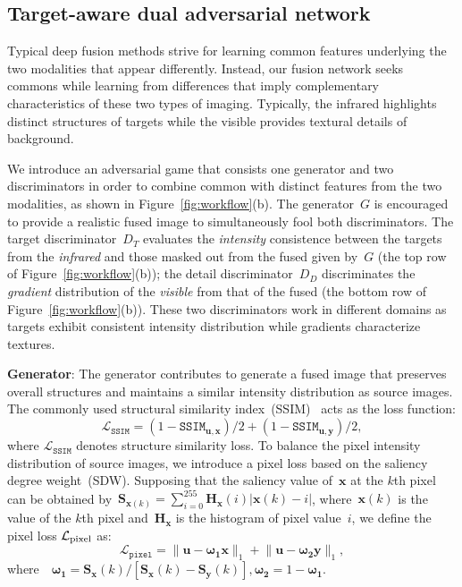 \documentclass[10pt,twocolumn,letterpaper]{article}
\begin{document}
\subsection{Target-aware dual adversarial network}
Typical deep fusion methods strive for learning common features underlying the two modalities that appear differently. Instead, our fusion network seeks commons while learning from differences that imply complementary characteristics of these two types of imaging. Typically, the infrared highlights distinct structures of targets while the visible provides textural details of background.

We introduce an adversarial game that consists one generator and two discriminators in order to combine common with distinct features from the two modalities, as shown in Figure~\ref{fig:workflow}(b). The generator~$G$ is encouraged to provide a realistic fused image to simultaneously fool both discriminators. The target discriminator~$D_T$ evaluates the \emph{intensity} consistence between the targets from the \emph{infrared} and those masked out from the fused given by~$G$ (the top row of Figure~\ref{fig:workflow}(b)); the detail discriminator~$D_D$ discriminates the \emph{gradient} distribution of the \emph{visible} from that of the fused (the bottom row of Figure~\ref{fig:workflow}(b)). These two discriminators work in different domains as targets exhibit consistent intensity distribution while gradients characterize textures.

\textbf{Generator}: The generator contributes to generate a fused image that preserves overall structures and  maintains a similar intensity distribution as source images. The commonly used structural similarity index~(SSIM)~\cite{wang2004image} acts as the loss function: 
\vspace{-0.2cm} 
\begin{equation}
\mathcal{L}_{\mathtt{SSIM}} = (1-{\mathtt{SSIM}}_{\mathbf{u},\mathbf{x}})/2 + (1 - {\mathtt{SSIM}}_{\mathbf{u},\mathbf{y}})/2, 
\end{equation}
where $\mathcal{L}_{\mathtt{SSIM}}$ denotes structure similarity loss. To balance the pixel intensity distribution of source images, we introduce a pixel loss based on the saliency degree weight~(SDW). Supposing that the saliency value of~$\mathbf{x}$ at the $k$th pixel can be obtained by~$\bm{S}_{\mathbf{x}(k)}=\sum\limits_{i=0}^{255}\bm{H}_{\mathbf{x}}(i)\lvert \mathbf{x}(k)-i\rvert $, where~$\mathbf{x}(k)$ is the value of the $k$th pixel and~$\bm{H}_\mathbf{x}$ is the histogram  of pixel value~$i$, we define the pixel loss $\mathcal{L}_{\rm pixel}$ as:
\begin{equation}
\mathcal{L}_{\mathtt{pixel}} = \lVert \mathbf{u}- \bm{\omega_1}\mathbf{x}\rVert_1 + \lVert \mathbf{u}- \bm{\omega_2}\mathbf{y}\rVert_1,
\end{equation}
where~~$\bm{\omega_1}= \bm{S}_{\mathbf{x}}(k)/[\bm{S}_{\mathbf{x}}(k) - \bm{S}_{\mathbf{y}}(k)], \bm{\omega_2}  = 1 - \bm{\omega_1}$.
\end{document}
